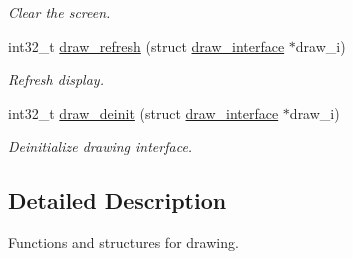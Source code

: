 \begin{DoxyCompactItemize}
\begin{DoxyCompactList}\small\item\em Clear the screen. \end{DoxyCompactList}\item 
int32\+\_\+t \hyperlink{group__drawing_ga485befc089e203ec54c8b06c8e72c9f3}{draw\+\_\+refresh} (struct \hyperlink{structdraw__interface}{draw\+\_\+interface} $\ast$draw\+\_\+i)\hypertarget{group__drawing_ga485befc089e203ec54c8b06c8e72c9f3}{}\label{group__drawing_ga485befc089e203ec54c8b06c8e72c9f3}

\begin{DoxyCompactList}\small\item\em Refresh display. \end{DoxyCompactList}\item 
int32\+\_\+t \hyperlink{group__drawing_gae59904fcfa6a1ad70e82854e02e7833a}{draw\+\_\+deinit} (struct \hyperlink{structdraw__interface}{draw\+\_\+interface} $\ast$draw\+\_\+i)\hypertarget{group__drawing_gae59904fcfa6a1ad70e82854e02e7833a}{}\label{group__drawing_gae59904fcfa6a1ad70e82854e02e7833a}

\begin{DoxyCompactList}\small\item\em Deinitialize drawing interface. \end{DoxyCompactList}\end{DoxyCompactItemize}


\subsection{Detailed Description}
Functions and structures for drawing. 

